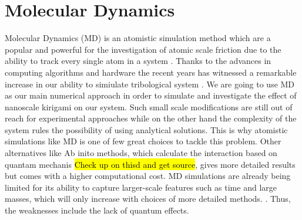 \chapter{Molecular Dynamics}\label{chap:MD}

Molecular Dynamics (\acrshort{MD}) is an atomistic simulation method which are a
popular and powerful for the investigation of atomic scale friction due to the
ability to track every single atom in a system \cite{Yalin_2011}. Thanks to the
advances in computing algorithms and hardware the recent years has witnessed a
remarkable increase in our ability to simiulate tribological system
\cite{Manini_2016}. We are going to use \acrshort{MD} as our main numerical
approach in order to simulate and investigate the effect of nanoscale kirigami
on our system. Such small scale modifications are still out of reach for
experimental approaches while on the other hand the complexity of the system
rules the possibility of using analytical solutions. This is why atomistic
simulations like \acrshort{MD} is one of few great choices to tackle this
problem. Other alternatives like Ab inito methods, which calculate the
interaction based on quantam mechanis \hl{Check up on thisd and get source},
gives more detailed results but comes with a higher computational cost.
\acrshort{MD} simulations are already being limited for its ability to capture
larger-scale features such as time and large masses, which will only increase
with choices of more detailed methods. \cite{Yalin_2011}. Thus, the weaknesses
include the lack of quantum effects.





